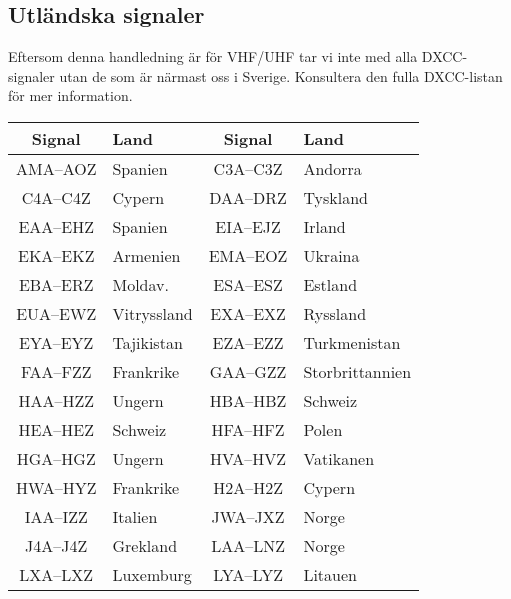 \subsection{Utländska signaler}

Eftersom denna handledning är för VHF/UHF tar vi inte med alla DXCC-signaler utan de som är närmast oss i Sverige. Konsultera den fulla DXCC-listan för mer information.

\begin{center}
\begin{longtable}{cl|cl}
	   \textbf{Signal}    & \textbf{Land}        & \textbf{Signal} & \textbf{Land}         \\ \hline
	\endhead
	   AMA--AOZ & Spanien              &    C3A--C3Z     & Andorra               \\
	      C4A--C4Z        & Cypern               &    DAA--DRZ     & Tyskland              \\
	      EAA--EHZ        & Spanien              &    EIA--EJZ     & Irland                \\
	      EKA--EKZ        & Armenien             &    EMA--EOZ     & Ukraina               \\
	      EBA--ERZ        & Moldav.              &    ESA--ESZ     & Estland               \\
	      EUA--EWZ        & Vitryssland          &    EXA--EXZ     & Ryssland              \\
	      EYA--EYZ        & Tajikistan           &    EZA--EZZ     & Turkmenistan          \\
	      FAA--FZZ        & Frankrike            &    GAA--GZZ     & Storbrittannien       \\
	      HAA--HZZ        & Ungern               &    HBA--HBZ     & Schweiz               \\
	      HEA--HEZ        & Schweiz              &    HFA--HFZ     & Polen                 \\
	      HGA--HGZ        & Ungern               &    HVA--HVZ     & Vatikanen             \\
	      HWA--HYZ        & Frankrike            &    H2A--H2Z     & Cypern                \\
	      IAA--IZZ        & Italien              &    JWA--JXZ     & Norge                 \\
	      J4A--J4Z        & Grekland             &    LAA--LNZ     & Norge                 \\
	      LXA--LXZ        & Luxemburg            &    LYA--LYZ     & Litauen               \\

\end{longtable}
\end{center}
